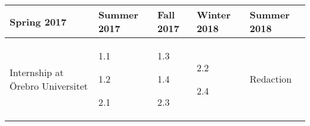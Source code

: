 \begin{tabu}{XXXXX}   
  \toprule 
  Spring 2017 &
  Summer 2017 &
  Fall 2017 &
  Winter 2018 &
  Summer 2018 \\
  \midrule 
  Internship at Örebro Universitet &
  1.1

  1.2

  2.1 &
  1.3
  
  1.4

  2.3 &
  2.2

  2.4 &
  Redaction \\
  \bottomrule 
\end{tabu}